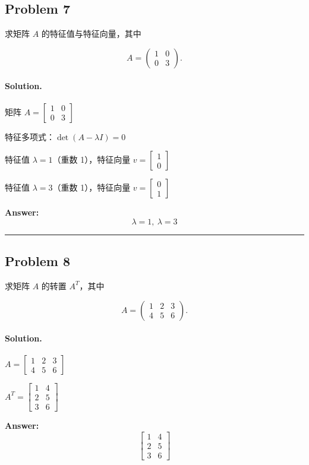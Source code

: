 \documentclass[12pt, a4paper]{ctexart}
\newcommand{\problem}[1]{\subsection*{Problem #1}}
\newcommand{\solution}{\paragraph{Solution.}}
\begin{document}
\problem{7}

求矩阵 $A$ 的特征值与特征向量，其中

$$A = \begin{pmatrix} 1 & 0 \\ 0 & 3 \end{pmatrix}.$$

\solution

矩阵 $A = \left[\begin{matrix}1 & 0\\0 & 3\end{matrix}\right]$

特征多项式：$\det(A - \lambda I) = 0$

特征值 $\lambda = 1$（重数 1），特征向量 $v = \left[\begin{matrix}1\\0\end{matrix}\right]$

特征值 $\lambda = 3$（重数 1），特征向量 $v = \left[\begin{matrix}0\\1\end{matrix}\right]$

\textbf{Answer:}
\[\boxed{\lambda = 1,\ \lambda = 3}\]

\vspace{1em}
\hrule
\vspace{1em}

\problem{8}

求矩阵 $A$ 的转置 $A^T$，其中

$$A = \begin{pmatrix} 1 & 2 & 3 \\ 4 & 5 & 6 \end{pmatrix}.$$

\solution

$A = \left[\begin{matrix}1 & 2 & 3\\4 & 5 & 6\end{matrix}\right]$

$A^T = \left[\begin{matrix}1 & 4\\2 & 5\\3 & 6\end{matrix}\right]$

\textbf{Answer:}
\[\boxed{\left[\begin{matrix}1 & 4\\2 & 5\\3 & 6\end{matrix}\right]}\]
\end{document}
